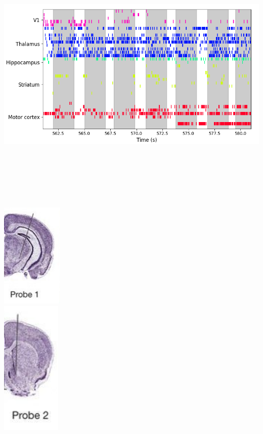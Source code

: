 \documentclass[a0,portrait]{a0poster}
\begin{document}
\begin{multicols}{2}
\begin{minipage}[b]{0.9\linewidth}
  \begin{center}
  \includegraphics[width=0.9\linewidth, height=13cm]{raster_plot.png}
  \end{center}
\end{minipage}
%
\begin{minipage}[b]{0.1\linewidth}
  \includegraphics[width=\linewidth, height=5cm]{probe_1.jpg} \\
  \includegraphics[width=0.9\linewidth, height=6.5cm]{probe_2.jpg} %
\end{minipage}


\end{multicols}
\end{document}
